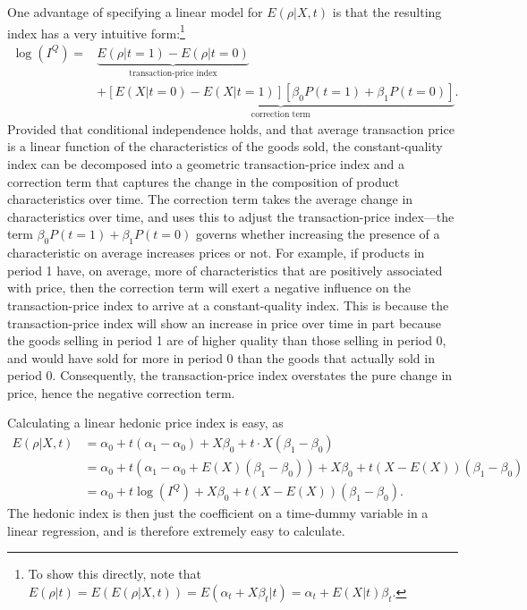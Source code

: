 \documentclass[
]{article}
\begin{document}
One advantage of specifying a linear model for \(E(\rho | X, t)\) is that the resulting index has a very intuitive form:\footnote{To show this directly, note that \(E(\rho | t) = E(E(\rho | X, t)) = E(\alpha_{t} + X\beta_{t} | t) = \alpha_{t} + E(X | t) \beta_{t}\).}
\begin{align*}
\log(I^{Q}) =& \underbrace{E(\rho | t = 1) - E(\rho | t = 0)}_{\text{transaction-price index}}\\
&+ \underbrace{[E(X | t = 0) - E(X | t = 1)][\beta_{0} P(t = 1) + \beta_{1} P(t = 0)]}_{\text{correction term}}.
\end{align*}
Provided that conditional independence holds, and that average transaction price is a linear function of the characteristics of the goods sold, the constant-quality index can be decomposed into a geometric transaction-price index and a correction term that captures the change in the composition of product characteristics over time. The correction term takes the average change in characteristics over time, and uses this to adjust the transaction-price index---the term \(\beta_{0} P(t = 1) + \beta_{1} P(t = 0)\) governs whether increasing the presence of a characteristic on average increases prices or not. For example, if products in period 1 have, on average, more of characteristics that are positively associated with price, then the correction term will exert a negative influence on the transaction-price index to arrive at a constant-quality index. This is because the transaction-price index will show an increase in price over time in part because the goods selling in period 1 are of higher quality than those selling in period 0, and would have sold for more in period 0 than the goods that actually sold in period 0. Consequently, the transaction-price index overstates the pure change in price, hence the negative correction term.

Calculating a linear hedonic price index is easy, as
\begin{align*}
E(\rho | X, t) &= \alpha_{0} + t (\alpha_{1} - \alpha_{0}) + X \beta_{0} + t \cdot X (\beta_{1} - \beta_{0}) \\
&= \alpha_{0} + t (\alpha_{1} - \alpha_{0} + E(X)(\beta_{1} - \beta_{0})) + X \beta_{0} + t (X - E(X)) (\beta_{1} - \beta_{0}) \\
&= \alpha_{0} + t \log(I^{Q}) + X \beta_{0} + t (X - E(X)) (\beta_{1} - \beta_{0}).
\end{align*}
The hedonic index is then just the coefficient on a time-dummy variable in a linear regression, and is therefore extremely easy to calculate.
\end{document}
